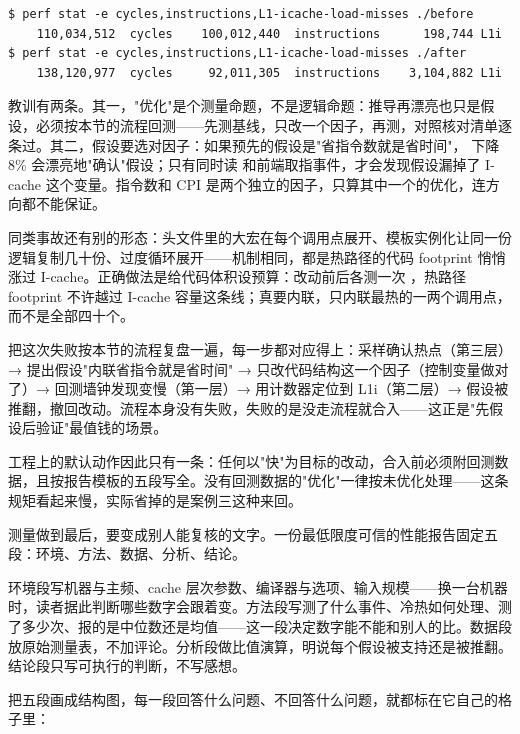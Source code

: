 \begin{lstlisting}
$ perf stat -e cycles,instructions,L1-icache-load-misses ./before
    110,034,512  cycles    100,012,440  instructions      198,744 L1i
$ perf stat -e cycles,instructions,L1-icache-load-misses ./after
    138,120,977  cycles     92,011,305  instructions    3,104,882 L1i
\end{lstlisting}

教训有两条。其一，"优化"是个测量命题，不是逻辑命题：推导再漂亮也只是假设，必须按本节的流程回测——先测基线，只改一个因子，再测，对照核对清单逐条过。其二，假设要选对因子：如果预先的假设是"省指令数就是省时间"， 下降 8\% 会漂亮地"确认"假设；只有同时读  和前端取指事件，才会发现假设漏掉了 I-cache 这个变量。指令数和 CPI 是两个独立的因子，只算其中一个的优化，连方向都不能保证。

同类事故还有别的形态：头文件里的大宏在每个调用点展开、模板实例化让同一份逻辑复制几十份、过度循环展开——机制相同，都是热路径的代码 footprint 悄悄涨过 I-cache。正确做法是给代码体积设预算：改动前后各测一次 ，热路径 footprint 不许越过 I-cache 容量这条线；真要内联，只内联最热的一两个调用点，而不是全部四十个。

把这次失败按本节的流程复盘一遍，每一步都对应得上：采样确认热点（第三层）→ 提出假设"内联省指令就是省时间" → 只改代码结构这一个因子（控制变量做对了）→ 回测墙钟发现变慢（第一层）→ 用计数器定位到 L1i（第二层）→ 假设被推翻，撤回改动。流程本身没有失败，失败的是没走流程就合入——这正是"先假设后验证"最值钱的场景。

工程上的默认动作因此只有一条：任何以"快"为目标的改动，合入前必须附回测数据，且按报告模板的五段写全。没有回测数据的"优化"一律按未优化处理——这条规矩看起来慢，实际省掉的是案例三这种来回。

测量做到最后，要变成别人能复核的文字。一份最低限度可信的性能报告固定五段：环境、方法、数据、分析、结论。

环境段写机器与主频、cache 层次参数、编译器与选项、输入规模——换一台机器时，读者据此判断哪些数字会跟着变。方法段写测了什么事件、冷热如何处理、测了多少次、报的是中位数还是均值——这一段决定数字能不能和别人的比。数据段放原始测量表，不加评论。分析段做比值演算，明说每个假设被支持还是被推翻。结论段只写可执行的判断，不写感想。

把五段画成结构图，每一段回答什么问题、不回答什么问题，就都标在它自己的格子里：

